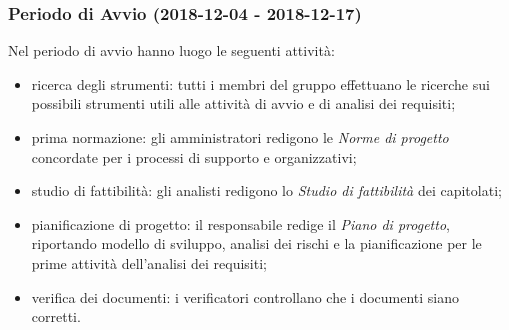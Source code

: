 	\subsubsection{Periodo di Avvio (2018-12-04 - 2018-12-17)}
		Nel periodo di avvio hanno luogo le seguenti attività:
		\begin{itemize}
			\item ricerca degli strumenti: tutti i membri del gruppo effettuano le ricerche sui possibili strumenti utili alle attività di avvio e di analisi dei requisiti;
			\item prima normazione: gli amministratori redigono le \textit{Norme di progetto} concordate per i processi di supporto e organizzativi;
			\item studio di fattibilità: gli analisti redigono lo \textit{Studio di fattibilità} dei capitolati;
			\item pianificazione di progetto: il responsabile redige il \textit{Piano di progetto}, riportando modello di sviluppo, analisi dei rischi e la pianificazione per le prime attività dell'analisi dei requisiti;
			\item verifica dei documenti: i verificatori controllano che i documenti siano corretti.
		\end{itemize}
		
